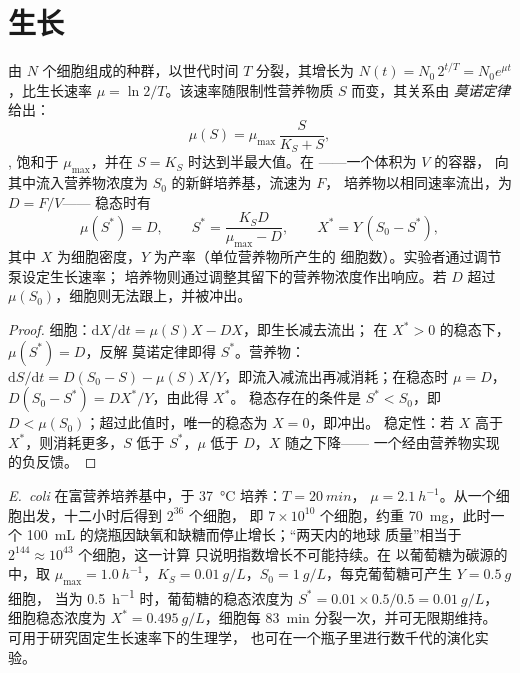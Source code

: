 \section{生长}

\begin{theorem}\label{thm:b3:bacteriology:monod}
由 $N$ 个细胞组成的种群，以世代时间 $T$ 分裂，其增长为
$N(t) = N_{0}\,2^{t/T} = N_{0}e^{\mu t}$，比生长速率 $\mu =
\ln 2/T$。该速率随限制性营养物质 $S$ 而变，其关系由
\emph{莫诺定律}给出：
\[
\mu(S) = \mu_{\max}\,\frac{S}{K_{S} + S},
\],
饱和于 $\mu_{\max}$，并在 $S = K_{S}$ 时达到半最大值。在
\emph{}——一个体积为 $V$ 的容器，
向其中流入营养物浓度为 $S_{0}$ 的新鲜培养基，流速为 $F$，
培养物以相同速率流出，为 $D = F/V$——
稳态时有
\[
\mu(S^{*}) = D,\qquad S^{*} = \frac{K_{S}D}{\mu_{\max} - D},\qquad
X^{*} = Y\,(S_{0} - S^{*}),
\]
其中 $X$ 为细胞密度，$Y$ 为产率（单位营养物所产生的
细胞数）。实验者通过调节泵设定生长速率；
培养物则通过调整其留下的营养物浓度作出响应。若 $D$
超过 $\mu(S_{0})$，细胞则无法跟上，并被冲出。
\end{theorem}
\begin{proof}
细胞：$\mathrm{d}X/\mathrm{d}t = \mu(S)X - DX$，即生长减去流出；
在 $X^{*} > 0$ 的稳态下，$\mu(S^{*}) = D$，反解
莫诺定律即得 $S^{*}$。营养物：$\mathrm{d}S/\mathrm{d}t = D(S_{0} -
S) - \mu(S)X/Y$，即流入减流出再减消耗；在稳态时
$\mu = D$，$D(S_{0} - S^{*}) = DX^{*}/Y$，由此得 $X^{*}$。
稳态存在的条件是 $S^{*} < S_{0}$，即 $D <
\mu(S_{0})$；超过此值时，唯一的稳态为 $X = 0$，即冲出。
稳定性：若 $X$ 高于 $X^{*}$，则消耗更多，$S$ 低于
$S^{*}$，$\mu$ 低于 $D$，$X$ 随之下降——
一个经由营养物实现的负反馈。
\end{proof}

\begin{example}[数字中的培养物]\label{ex:b3:bacteriology:numbers}
\emph{E.~coli} 在富营养培养基中，于 \qty{37}{\celsius} 培养：$T = \qty{20}{min}$，
$\mu = \qty{2.1}{h^{-1}}$。从一个细胞出发，十二小时后得到 $2^{36}$ 个细胞，
即 $7\times 10^{10}$ 个细胞，约重 \qty{70}{mg}，此时一个
\qty{100}{mL} 的烧瓶因缺氧和缺糖而停止增长；“两天内的地球
质量”相当于 $2^{144}\approx 10^{43}$ 个细胞，这一计算
只说明指数增长不可能持续。在
以葡萄糖为碳源的中，取 $\mu_{\max} = \qty{1.0}{h^{-1}}$，$K_{S} =
\qty{0.01}{g/L}$，$S_{0} = \qty{1}{g/L}$，每克葡萄糖可产生 $Y = \qty{0.5}{g}$ 细胞，
当为 \qty{0.5}{h^{-1}} 时，葡萄糖的稳态浓度为 $S^{*}
= 0.01\times 0.5/0.5 = \qty{0.01}{g/L}$，细胞稳态浓度为 $X^{*} =
\qty{0.495}{g/L}$，细胞每 \qty{83}{min} 分裂一次，并可无限期维持。
可用于研究固定生长速率下的生理学，
也可在一个瓶子里进行数千代的演化实验。
\end{example}

